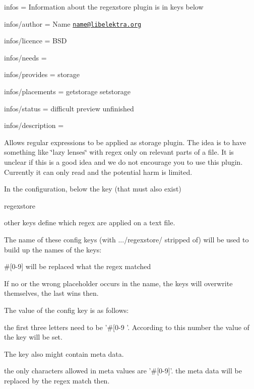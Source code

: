 
\begin{DoxyItemize}
\item infos = Information about the regexstore plugin is in keys below
\item infos/author = Name \href{mailto:name@libelektra.org}{\tt name@libelektra.\+org}
\item infos/licence = B\+S\+D
\item infos/needs =
\item infos/provides = storage
\item infos/placements = getstorage setstorage
\item infos/status = difficult preview unfinished
\item infos/description =
\end{DoxyItemize}

Allows regular expressions to be applied as storage plugin. The idea is to have something like \char`\"{}lazy lenses\char`\"{} with regex only on relevant parts of a file. It is unclear if this is a good idea and we do not encourage you to use this plugin. Currently it can only read and the potential harm is limited.

In the configuration, below the key (that must also exist) \begin{DoxyVerb}regexstore
\end{DoxyVerb}


other keys define which regex are applied on a text file.

The name of these config keys (with .../regexstore/ stripped of) will be used to build up the names of the keys\+:
\begin{DoxyItemize}
\item \#\mbox{[}0-\/9\mbox{]} will be replaced what the regex matched
\item If no or the wrong placeholder occurs in the name, the keys will overwrite themselves, the last wins then.
\end{DoxyItemize}

The value of the config key is as follows\+:
\begin{DoxyItemize}
\item the first three letters need to be '\#\mbox{[}0-\/9 '. According to this number the value of the key will be set.
\end{DoxyItemize}

The key also might contain meta data.
\begin{DoxyItemize}
\item the only characters allowed in meta values are '\#\mbox{[}0-\/9\mbox{]}'. the meta data will be replaced by the regex match then.
\end{DoxyItemize}

